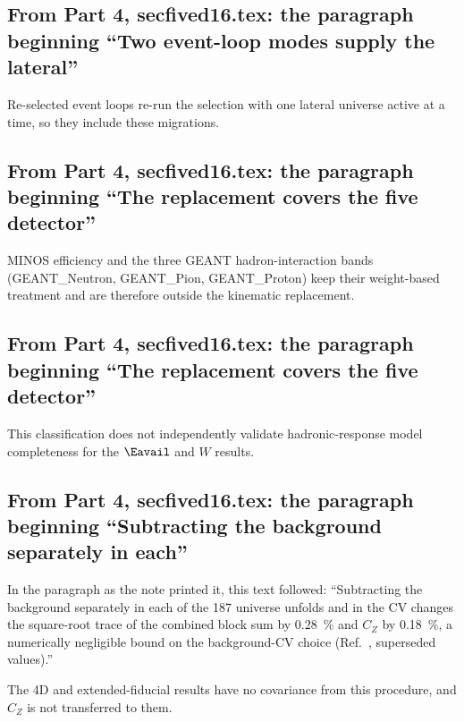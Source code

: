 \subsection{From Part 4, secfived16.tex: the paragraph beginning ``Two event-loop modes supply the lateral''}
Re-selected event loops re-run the selection with one lateral universe active at a time, so they include these migrations.

\subsection{From Part 4, secfived16.tex: the paragraph beginning ``The replacement covers the five detector''}
MINOS efficiency and the three GEANT hadron-interaction bands (GEANT\_Neutron, GEANT\_Pion, GEANT\_Proton) keep their weight-based treatment and are therefore outside the kinematic replacement.

\subsection{From Part 4, secfived16.tex: the paragraph beginning ``The replacement covers the five detector''}
This classification does not independently validate hadronic-response model completeness for the $\Eavail$ and $W$ results.

\subsection{From Part 4, secfived16.tex: the paragraph beginning ``Subtracting the background separately in each''}
In the paragraph as the note printed it, this text followed: ``Subtracting the background separately in each of the 187 universe unfolds and in the CV changes the square-root trace of the combined block sum by \SI{0.28}{\percent} and $C_Z$ by \SI{0.18}{\percent}, a numerically negligible bound on the background-CV choice (Ref.~\cite{NoteRecords2026}, superseded values).''\par
The 4D and extended-fiducial results have no covariance from this procedure, and $C_Z$ is not transferred to them.


